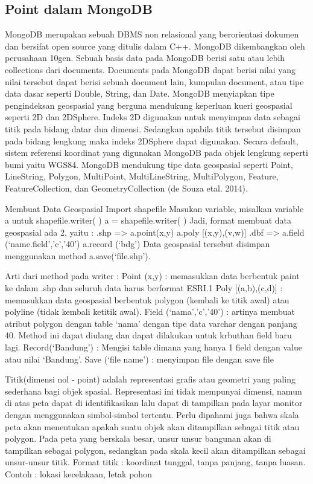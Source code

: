 \subsection{Point dalam MongoDB}
	MongoDB merupakan sebuah DBMS non relasional yang berorientasi dokumen dan bersifat open source yang ditulis dalam C++. MongoDB dikembangkan oleh perusahaan 10gen. Sebuah basis data pada MongoDB berisi satu atau lebih collections dari documents. Documents pada MongoDB dapat berisi nilai yang nilai tersebut dapat berisi sebuah document lain, kumpulan document, atau tipe data dasar seperti Double, String, dan Date. MongoDB menyiapkan tipe pengindeksan geospasial yang berguna mendukung keperluan kueri geospasial seperti 2D dan 2DSphere. Indeks 2D digunakan untuk menyimpan data sebagai titik pada bidang datar dua dimensi. Sedangkan apabila titik tersebut disimpan pada bidang lengkung maka indeks 2DSphere dapat digunakan. Secara default, sistem referensi koordinat yang digunakan MongoDB pada objek lengkung seperti bumi yaitu WGS84. MongoDB mendukung tipe data geospasial seperti Point, LineString, Polygon, MultiPoint, MultiLineString, MultiPolygon, Feature, FeatureCollection, dan GeometryCollection (de Souza etal. 2014).

Membuat Data Geospasial
Import shapefile
Masukan variable, misalkan variable a untuk shapefile.writer( )
a = shapefile.writer( )
Jadi, format membuat data geospasial ada 2, yaitu :
.shp => a.point(x,y)
a.poly [(x,y),(v,w)]
.dbf => a.field (‘name.field’,’c’,’40’)
a.record (‘bdg’)
Data geospasial tersebut disimpan menggunakan method a.save(‘file.shp’).

Arti dari method pada writer :
Point (x,y)	: memasukkan data berbentuk paint ke dalam .shp dan seluruh data harus  berformat ESRI.1
Poly [(a,b),(c,d)]	: memasukkan data geospasial berbentuk polygon (kembali ke titik    awal) atau polyline (tidak kembali ketitik awal).
Field (‘nama’,’c’,’40’)	: artinya membuat atribut polygon dengan table ‘nama’ dengan tipe data varchar dengan panjang 40. Method ini dapat diulang dan dapat dilakukan untuk krbuthan field baru lagi.
Record(‘Bandung’)	: Mengisi table dimana yang hanya 1 field dengan value atau nilai    ‘Bandung’.
Save (‘file name’)	: menyimpan file dengan save file

	Titik(dimensi nol - point) adalah representasi grafis atau geometri yang paling sederhana bagi objek spasial. Representasi ini tidak mempunyai dimensi, namun di atas peta dapat di identifikasikan lalu dapat di tampilkan pada layar monitor dengan menggunakan simbol-simbol tertentu. Perlu dipahami juga bahwa skala peta akan menentukan apakah suatu objek akan ditampilkan sebagai titik atau polygon. Pada peta yang berskala besar, unsur unsur bangunan akan di tampilkan sebagai polygon, sedangkan pada skala kecil akan ditampilkan sebagai unsur-unsur titik.
Format titik : koordinat tunggal, tanpa panjang, tanpa luasan.
Contoh : lokasi kecelakaan, letak pohon

